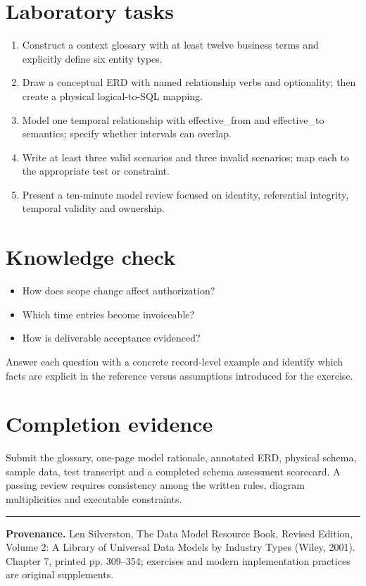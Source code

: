 \documentclass[11pt,letterpaper]{article}
\begin{document}
\section{Laboratory tasks}
\begin{enumerate}
\item Construct a context glossary with at least twelve business terms and explicitly define six entity types.
\item Draw a conceptual ERD with named relationship verbs and optionality; then create a physical logical-to-SQL mapping.
\item Model one temporal relationship with effective\_from and effective\_to semantics; specify whether intervals can overlap.
\item Write at least three valid scenarios and three invalid scenarios; map each to the appropriate test or constraint.
\item Present a ten-minute model review focused on identity, referential integrity, temporal validity and ownership.
\end{enumerate}

\section{Knowledge check}
\begin{itemize}
\item How does scope change affect authorization?
\item Which time entries become invoiceable?
\item How is deliverable acceptance evidenced?
\end{itemize}
Answer each question with a concrete record-level example and identify which facts are explicit in the reference versus assumptions introduced for the exercise.


\section{Completion evidence}
Submit the glossary, one-page model rationale, annotated ERD, physical schema, sample data, test transcript and a completed schema assessment scorecard. A passing review requires consistency among the written rules, diagram multiplicities and executable constraints.


\vfill
\hrule
{\footnotesize\textbf{Provenance.} Len Silverston, The Data Model Resource Book, Revised Edition, Volume 2: A Library of Universal Data Models by Industry Types (Wiley, 2001). Chapter 7, printed pp. 309--354; exercises and modern implementation practices are original supplements.}
\end{document}
